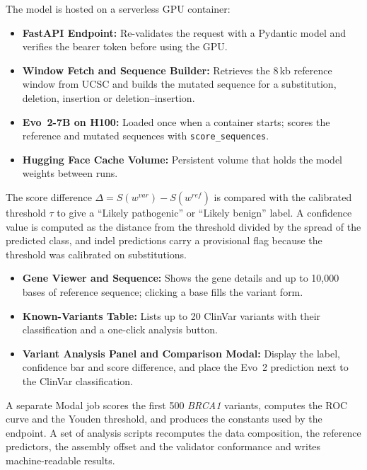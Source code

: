 The model is hosted on a serverless GPU container:
\begin{itemize}
\item \textbf{FastAPI Endpoint:} Re-validates the request with a Pydantic model and verifies the bearer token before using the GPU.
\item \textbf{Window Fetch and Sequence Builder:} Retrieves the 8\,kb reference window from UCSC and builds the mutated sequence for a substitution, deletion, insertion or deletion--insertion.
\item \textbf{Evo~2-7B on H100:} Loaded once when a container starts; scores the reference and mutated sequences with \texttt{score\_sequences}.
\item \textbf{Hugging Face Cache Volume:} Persistent volume that holds the model weights between runs.
\end{itemize}

The score difference $\Delta=S(w^{var})-S(w^{ref})$ is compared with the calibrated threshold $\tau$ to give a ``Likely pathogenic'' or ``Likely benign'' label. A confidence value is computed as the distance from the threshold divided by the spread of the predicted class, and indel predictions carry a provisional flag because the threshold was calibrated on substitutions.

\begin{itemize}
\item \textbf{Gene Viewer and Sequence:} Shows the gene details and up to 10,000 bases of reference sequence; clicking a base fills the variant form.
\item \textbf{Known-Variants Table:} Lists up to 20 ClinVar variants with their classification and a one-click analysis button.
\item \textbf{Variant Analysis Panel and Comparison Modal:} Display the label, confidence bar and score difference, and place the Evo~2 prediction next to the ClinVar classification.
\end{itemize}

A separate Modal job scores the first 500 \textit{BRCA1} variants, computes the ROC curve and the Youden threshold, and produces the constants used by the endpoint. A set of analysis scripts recomputes the data composition, the reference predictors, the assembly offset and the validator conformance and writes machine-readable results.

